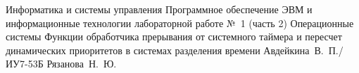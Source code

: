 \makereporttitle
{Информатика и системы управления} %
{Программное обеспечение ЭВМ и информационные технологии} %
{лабораторной работе №~1 (часть 2)} %
{Операционные системы} %
{Функции обработчика прерывания от системного таймера и пересчет динамических приоритетов в системах разделения времени} %
{} %
{Авдейкина~В.~П./ИУ7-53Б} %
{Рязанова~Н.~Ю.} %